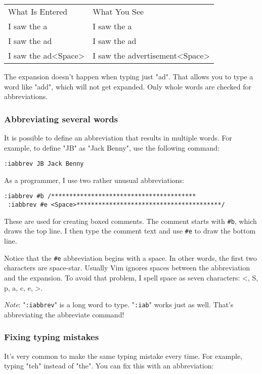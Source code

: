 \begin{center} \begin{tabular}{l l}
				What Is Entered & What You See \\
				I saw the a & I saw the a \\
				I saw the ad & I saw the ad \\
				I saw the ad<Space> & I saw the advertisement<Space> \\
\end{tabular} \end{center}
The expansion doesn't happen when typing just "ad".
That allows you to type a word like "add", which will not get expanded.
Only whole words are checked for abbreviations.
\subsubsection{Abbreviating several words}
It is possible to define an abbreviation that results in multiple words.
For example, to define "JB" as "Jack Benny", use the following command:

\begin{Verbatim}[samepage=true]
 :iabbrev JB Jack Benny
\end{Verbatim}

As a programmer, I use two rather unusual abbreviations:

\begin{Verbatim}[samepage=true]
 :iabbrev #b /****************************************
 :iabbrev #e <Space>****************************************/
\end{Verbatim}

These are used for creating boxed comments.
The comment starts with \verb!#b!, which draws the top line.
I then type the comment text and use \verb!#e! to draw the bottom line.

Notice that the \verb!#e! abbreviation begins with a space.
In other words, the first two characters are space-star.
Usually Vim ignores spaces between the abbreviation and the expansion.
To avoid that problem, I spell space as seven characters: <, S, p, a, c, e, >.

\emph{Note}: "\verb!:iabbrev!" is a long word to type.
"\verb!:iab!" works just as well.
That's abbreviating the abbreviate command!
\subsubsection{Fixing typing mistakes}
It's very common to make the same typing mistake every time.
For example, typing "teh" instead of "the".
You can fix this with an abbreviation:

